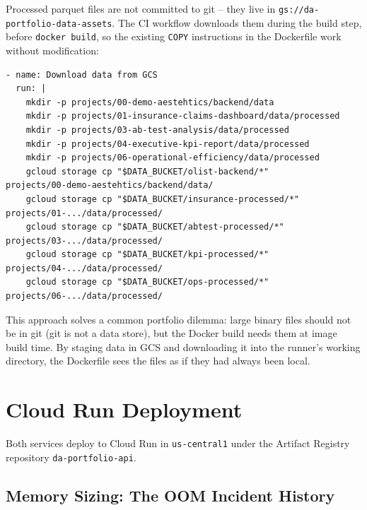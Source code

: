 Processed parquet files are not committed to git -- they live in \texttt{gs://da-portfolio-data-assets}. The CI workflow downloads them during the build step, before \texttt{docker build}, so the existing \texttt{COPY} instructions in the Dockerfile work without modification:

\begin{lstlisting}[style=yaml, caption={GCS data download step in deploy-api.yml}]
- name: Download data from GCS
  run: |
    mkdir -p projects/00-demo-aestehtics/backend/data
    mkdir -p projects/01-insurance-claims-dashboard/data/processed
    mkdir -p projects/03-ab-test-analysis/data/processed
    mkdir -p projects/04-executive-kpi-report/data/processed
    mkdir -p projects/06-operational-efficiency/data/processed
    gcloud storage cp "$DATA_BUCKET/olist-backend/*"       projects/00-demo-aestehtics/backend/data/
    gcloud storage cp "$DATA_BUCKET/insurance-processed/*" projects/01-.../data/processed/
    gcloud storage cp "$DATA_BUCKET/abtest-processed/*"    projects/03-.../data/processed/
    gcloud storage cp "$DATA_BUCKET/kpi-processed/*"       projects/04-.../data/processed/
    gcloud storage cp "$DATA_BUCKET/ops-processed/*"       projects/06-.../data/processed/
\end{lstlisting}

This approach solves a common portfolio dilemma: large binary files should not be in git (git is not a data store), but the Docker build needs them at image build time. By staging data in GCS and downloading it into the runner's working directory, the Dockerfile sees the files as if they had always been local.

\section{Cloud Run Deployment}
\label{sec:infra-cloudrun}


Both services deploy to Cloud Run in \texttt{us-central1} under the Artifact Registry repository \texttt{da-portfolio-api}.

\subsection{Memory Sizing: The OOM Incident History}

